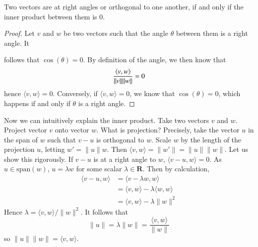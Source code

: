 \begin{corollary}
  Two vectors are at right angles or orthogonal to one another, if and only if the inner product between them is 0.
\end{corollary}
\begin{proof}
  Let $v$ and $w$ be two vectors such that the angle $\theta$ between them is a right angle. It 
  \theoremstyle{definition}follows that $\cos(\theta) = 0$. By definition of the angle, we then know that
  \[ \frac{\langle v, w\rangle}{\|v\|\|w\|} = 0 \]
  hence $\langle v, w \rangle = 0$. Conversely, if $\langle v, w \rangle = 0$, we know that $\cos(\theta) = 0$, which happens if and only if $\theta$ is a right angle.
\end{proof}

Now we can intuitively explain the inner product. Take two vectors $v$ and $w$. Project vector $v$ onto vector $w$. What is projection? Precisely, take the vector $u$ in the span of $w$ such that $v - u$ is orthogonal to $w$. Scale $w$ by the length of the projection $u$, letting $w' = \|u\| w$. Then $\langle v, w \rangle = \| w' \| = \| u \| \| w \|$. Let us show this rigorously. If $v - u$ is at a right angle to $w$, $\langle v - u, w \rangle = 0$. As $u \in \text{span}(w)$, $u = \lambda w$ for some scalar $\lambda \in \mathbf{R}$. Then by calculation,
%
\begin{align*}
  \langle v - u, w \rangle &= \langle v - \lambda w, w \rangle\\
                           &= \langle v, w \rangle - \lambda \langle w, w \rangle\\
                           &= \langle v, w \rangle - \lambda \|w\|^2
\end{align*}
%
Hence $\lambda = \langle v, w \rangle/\|w\|^2$. It follows that
%
\[ \|u\| = \lambda \| w \| = \frac{\langle v, w \rangle}{\|w\|} \]
%
so $\|u\|\|w\| = \langle v, w \rangle$.

\begin{center}
\end{center}

